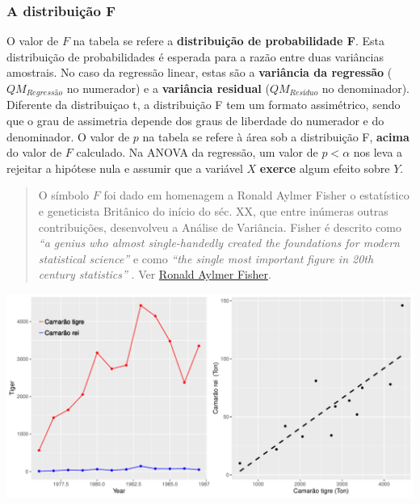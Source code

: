 \documentclass[
]{book}
\begin{document}
\hypertarget{a-distribuiuxe7uxe3o-f}{%
\subsubsection{A distribuição F}\label{a-distribuiuxe7uxe3o-f}}

O valor de \(F\) na tabela se refere a \textbf{distribuição de probabilidade F}. Esta distribuição de probabilidades é esperada para a razão entre duas variâncias amostrais. No caso da regressão linear, estas são a \textbf{variância da regressão} (\(QM_{Regressão}\) no numerador) e a \textbf{variância residual} (\(QM_{Resíduo}\) no denominador). Diferente da distribuiçao t, a distribuição F tem um formato assimétrico, sendo que o grau de assimetria depende dos graus de liberdade do numerador e do denominador. O valor de \(p\) na tabela se refere à área sob a distribuição F, \textbf{acima} do valor de \(F\) calculado. Na ANOVA da regressão, um valor de \(p < \alpha\) nos leva a rejeitar a hipótese nula e assumir que a variável \(X\) \textbf{exerce} algum efeito sobre \(Y\).

\begin{quote}
O símbolo \(F\) foi dado em homenagem a Ronald Aylmer Fisher o estatístico e geneticista Britânico do início do séc. XX, que entre inúmeras outras contribuições, desenvolveu a Análise de Variância. Fisher é descrito como \emph{``a genius who almost single-handedly created the foundations for modern statistical science''} \citep{halt1998history} e como \emph{``the single most important figure in 20th century statistics''} \citep{efron1998r}. Ver \href{https://en.wikipedia.org/wiki/Ronald_Fisher}{Ronald Aylmer Fisher}.
\end{quote}

\begin{center}\includegraphics{probest-cambientais_files/figure-latex/unnamed-chunk-160-1} \end{center}
\end{document}

